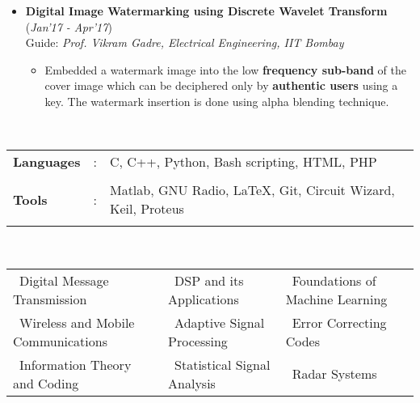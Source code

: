 \documentclass[10pt]{article}
\newcommand\hs{1.3mm}		%
\begin{document}
\begin{itemize}[leftmargin=0.4cm]
\item \textbf{Digital Image Watermarking using Discrete Wavelet Transform}
\hfill{(\textit{Jan'17 - Apr'17})}\\
Guide: \textit{Prof. Vikram Gadre, Electrical Engineering, IIT Bombay}\\\vspace{-0.68cm}
	\begin{itemize}
	\item Embedded a watermark image into the low \textbf{frequency sub-band} of the cover image which can be deciphered only by \textbf{authentic users} using a key. The watermark insertion is done using alpha blending technique.
	\end{itemize}
	
	\vspace{-0.05cm}


\end{itemize}

\colorbox{bl}{}\\
\begin{tabular}{m{1in}m{0.20in}m{4.5in}}
	\\[-3mm]
	\hspace{\hs} \hspace{0.12cm}\textbf{\textbf{Languages}} &: & {{C, C++, Python, Bash scripting, HTML, PHP}} \\
	\\[-3.5mm]
	\hspace{\hs} \hspace{0.12cm}\textbf{\textbf{Tools}} &: & {Matlab, GNU Radio, \LaTeX, Git, Circuit Wizard, Keil, Proteus}\\
	\\[-4mm]
\end{tabular}\\

	\colorbox{bl}{}%
	\vspace{0.15cm} 

	
	\begin{tabular}{ l l l }
		\hspace{0.55cm}\textbullet\ Digital Message Transmission &  \textbullet\ DSP and its Applications & \textbullet\ Foundations of Machine Learning\\
		\hspace{0.55cm}\textbullet\ Wireless and Mobile Communications & \textbullet\ Adaptive Signal Processing & \textbullet\ Error Correcting Codes\\
		\hspace{0.55cm}\textbullet\ Information Theory and Coding & \textbullet\ Statistical Signal Analysis  & \textbullet\ Radar Systems\\ 
		
	\end{tabular}
	\setlength{\tabcolsep}{0.1cm}
	
\end{document}
